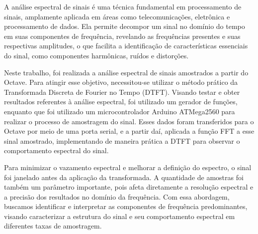 A análise espectral de sinais é uma técnica fundamental em processamento de sinais, amplamente aplicada em áreas como telecomunicações, eletrônica e processamento de dados. Ela permite decompor um sinal no domínio do tempo em suas componentes de frequência, revelando as frequências presentes e suas respectivas amplitudes, o que facilita a identificação de características essenciais do sinal, como componentes harmônicas, ruídos e distorções.

Neste trabalho, foi realizada a análise espectral de sinais amostrados a partir do Octave. Para atingir esse objetivo, necessitou-se utilizar o método prático da Transformada Discreta de Fourier no Tempo (DTFT). Visando testar e obter resultados referentes à análise espectral, foi utilizado um gerador de funções, enquanto que foi utilizado um microcontrolador Arduino ATMega2560 para realizar o processo de amostragem do sinal. Esses dados foram transferidos para o Octave por meio de uma porta serial, e a partir daí, aplicada a função FFT a esse sinal amostrado, implementando de maneira prática a DTFT para observar o comportamento espectral do sinal.

Para minimizar o vazamento espectral e melhorar a definição do espectro, o sinal foi janelado antes da aplicação da transformada. A quantidade de amostras foi também um parâmetro importante, pois afeta diretamente a resolução espectral e a precisão dos resultados no domínio da frequência. Com essa abordagem, buscamos identificar e interpretar as componentes de frequência predominantes, visando caracterizar a estrutura do sinal e seu comportamento espectral em diferentes taxas de amostragem.
